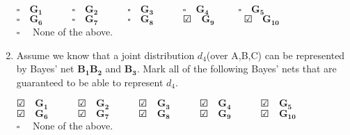 \documentclass[11pt, answers]{exam}
\begin{document}
\begin{enumerate}
$\square \quad \mathbf{G_1} \quad   \quad \quad \square \quad \mathbf{G_2} \quad \quad \quad \square  \quad\mathbf{G_3} \quad \quad \quad \square \quad \mathbf{G_4} \quad \quad \quad \square  \quad \mathbf{G_5}$\\

$\square \quad \mathbf{G_6} \quad   \quad \quad \square \quad \mathbf{G_7} \quad \quad \quad \square  \quad\mathbf{G_8} \quad \quad \quad \CheckedBox \quad \mathbf{G_9} \quad \quad \quad \CheckedBox  \quad \mathbf{G_{10}}$\\

$\square \quad $ None of the above.

\item Assume we know that a joint distribution $d_4$(over A,B,C) can be represented by Bayes' net $\mathbf{B_1} \mathbf{B_2}$ and $\mathbf{B_3}$. Mark all of the following Bayes' nets that are guaranteed to be able to represent $d_4$.

$\CheckedBox \quad \mathbf{G_1} \quad   \quad \quad \CheckedBox \quad \mathbf{G_2} \quad \quad \quad \CheckedBox  \quad\mathbf{G_3} \quad \quad \quad \CheckedBox \quad \mathbf{G_4} \quad \quad \quad \CheckedBox  \quad \mathbf{G_5}$\\

$\CheckedBox \quad \mathbf{G_6} \quad   \quad \quad \CheckedBox \quad \mathbf{G_7} \quad \quad \quad \CheckedBox  \quad\mathbf{G_8} \quad \quad \quad \CheckedBox \quad \mathbf{G_9} \quad \quad \quad \CheckedBox  \quad \mathbf{G_{10}}$\\

$\square \quad $ None of the above.
\end{enumerate}

\newpage
\end{document}
